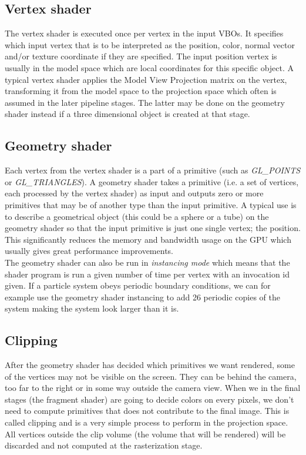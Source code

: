 \subsection{Vertex shader}
The vertex shader is executed once per vertex in the input VBOs. It specifies which input vertex that is to be interpreted as the position, color, normal vector and/or texture coordinate if they are specified. The input position vertex is usually in the model space which are local coordinates for this specific object. A typical vertex shader applies the Model View Projection matrix on the vertex, transforming it from the model space to the projection space which often is assumed in the later pipeline stages. The latter may be done on the geometry shader instead if a three dimensional object is created at that stage.
\subsection{Geometry shader}
Each vertex from the vertex shader is a part of a primitive (such as \textit{GL\_POINTS} or \textit{GL\_TRIANGLES}). A geometry shader takes a primitive (i.e. a set of vertices, each processed by the vertex shader) as input and outputs zero or more primitives that may be of another type than the input primitive. A typical use is to describe a geometrical object (this could be a sphere or a tube) on the geometry shader so that the input primitive is just one single vertex; the position. This significantly reduces the memory and bandwidth usage on the GPU which usually gives great performance improvements.\\
The geometry shader can also be run in \textit{instancing mode} which means that the shader program is run a given number of time per vertex with an invocation id given. If a particle system obeys periodic boundary conditions, we can for example use the geometry shader instancing to add 26 periodic copies of the system making the system look larger than it is. 
\subsection{Clipping}
After the geometry shader has decided which primitives we want rendered, some of the vertices may not be visible on the screen. They can be behind the camera, too far to the right or in some way outside the camera view. When we in the final stages (the fragment shader) are going to decide colors on every pixels, we don't need to compute primitives that does not contribute to the final image. This is called clipping and is a very simple process to perform in the projection space. All vertices outside the clip volume (the volume that will be rendered) will be discarded and not computed at the rasterization stage.
